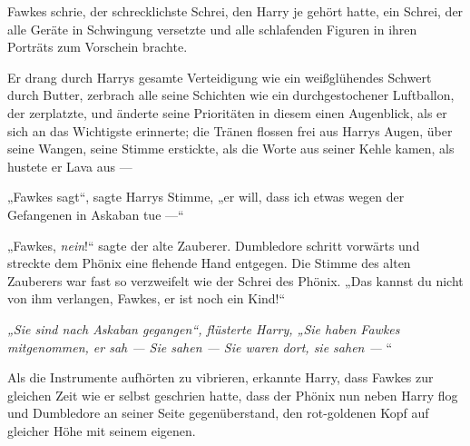 Fawkes schrie, der schrecklichste Schrei, den Harry je gehört hatte, ein Schrei, der alle Geräte in Schwingung versetzte und alle schlafenden Figuren in ihren Porträts zum Vorschein brachte.

Er drang durch Harrys gesamte Verteidigung wie ein weißglühendes Schwert durch Butter, zerbrach alle seine Schichten wie ein durchgestochener Luftballon, der zerplatzte, und änderte seine Prioritäten in diesem einen Augenblick, als er sich an das Wichtigste erinnerte; die Tränen flossen frei aus Harrys Augen, über seine Wangen, seine Stimme erstickte, als die Worte aus seiner Kehle kamen, als hustete er Lava aus —

„Fawkes sagt“, sagte Harrys Stimme, „er will, dass ich etwas wegen der Gefangenen in Askaban tue —“

„Fawkes, \emph{nein}!“ sagte der alte Zauberer. Dumbledore schritt vorwärts und streckte dem Phönix eine flehende Hand entgegen. Die Stimme des alten Zauberers war fast so verzweifelt wie der Schrei des Phönix.
„Das kannst du nicht von ihm verlangen, Fawkes, er ist noch ein Kind!“

\emph{„Sie sind nach Askaban gegangen“, flüsterte Harry,
„Sie haben Fawkes mitgenommen, er sah — \emph{Sie} sahen — Sie waren \emph{dort}, sie sahen — }“

Als die Instrumente aufhörten zu vibrieren, erkannte Harry, dass Fawkes zur gleichen Zeit wie er selbst geschrien hatte, dass der Phönix nun neben Harry flog und Dumbledore an seiner Seite gegenüberstand, den rot-goldenen Kopf auf gleicher Höhe mit seinem eigenen.

